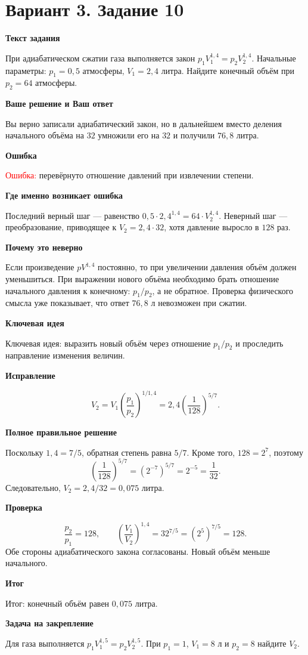\documentclass[11pt,a4paper]{article}
\newcommand{\Part}[1]{\par\medskip\noindent\textbf{#1}\par\smallskip}
\newcommand{\Task}[2]{\clearpage\phantomsection\label{task:#1}\section*{#2}}
\newcommand{\Err}[1]{\textcolor{red}{Ошибка:} #1}
\newcommand{\Idea}[1]{\textcolor{blue!60!black}{Ключевая идея:} #1}
\newcommand{\Result}[1]{\textcolor{teal!60!black}{Итог:} #1}
\begin{document}
\Task{v310}{Вариант 3. Задание 10}
\Part{Текст задания}
При адиабатическом сжатии газа выполняется закон $p_1V_1^{1{,}4}=p_2V_2^{1{,}4}$. Начальные параметры: $p_1=0{,}5$ атмосферы, $V_1=2{,}4$ литра. Найдите конечный объём при $p_2=64$ атмосферы.
\Part{Ваше решение и Ваш ответ}
Вы верно записали адиабатический закон, но в дальнейшем вместо деления начального объёма на $32$ умножили его на $32$ и получили $76{,}8$ литра.
\Part{Ошибка}
\Err{перевёрнуто отношение давлений при извлечении степени.}
\Part{Где именно возникает ошибка}
Последний верный шаг --- равенство $0{,}5\cdot2{,}4^{1{,}4}=64\cdot V_2^{1{,}4}$. Неверный шаг --- преобразование, приводящее к $V_2=2{,}4\cdot32$, хотя давление выросло в $128$ раз.
\Part{Почему это неверно}
Если произведение $pV^{1{,}4}$ постоянно, то при увеличении давления объём должен уменьшиться. При выражении нового объёма необходимо брать отношение начального давления к конечному: $p_1/p_2$, а не обратное. Проверка физического смысла уже показывает, что ответ $76{,}8$ л невозможен при сжатии.
\Part{Ключевая идея}
\Idea{выразить новый объём через отношение $p_1/p_2$ и проследить направление изменения величин.}
\Part{Исправление}
\[V_2=V_1\left(\frac{p_1}{p_2}\right)^{1/1{,}4}=2{,}4\left(\frac1{128}\right)^{5/7}.\]
\Part{Полное правильное решение}
Поскольку $1{,}4=7/5$, обратная степень равна $5/7$. Кроме того, $128=2^7$, поэтому
\[\left(\frac1{128}\right)^{5/7}=(2^{-7})^{5/7}=2^{-5}=\frac1{32}.\]
Следовательно, $V_2=2{,}4/32=0{,}075$ литра.
\Part{Проверка}
\[\frac{p_2}{p_1}=128,\qquad\left(\frac{V_1}{V_2}\right)^{1{,}4}=32^{7/5}=(2^5)^{7/5}=128.\]
Обе стороны адиабатического закона согласованы. Новый объём меньше начального.
\Part{Итог}
\Result{конечный объём равен $0{,}075$ литра.}
\Part{Задача на закрепление}
Для газа выполняется $p_1V_1^{1{,}5}=p_2V_2^{1{,}5}$. При $p_1=1$, $V_1=8$ л и $p_2=8$ найдите $V_2$.
\end{document}
